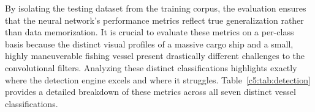 By isolating the testing dataset from the training corpus, the evaluation ensures that the neural network's performance metrics reflect true generalization rather than data memorization. It is crucial to evaluate these metrics on a per-class basis because the distinct visual profiles of a massive cargo ship and a small, highly maneuverable fishing vessel present drastically different challenges to the convolutional filters. Analyzing these distinct classifications highlights exactly where the detection engine excels and where it struggles. Table~\ref{c5:tab:detection} provides a detailed breakdown of these metrics across all seven distinct vessel classifications.

\begin{table}[H]
\fontsize{10}{12}\selectfont
\centering
\caption{\gls{yolov8} per-class detection performance on the \gls{smd} test set}
\label{c5:tab:detection}

\end{table}


